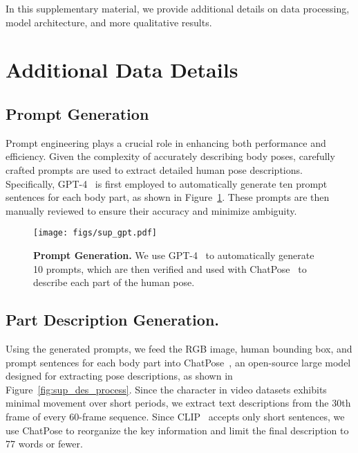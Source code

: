 \clearpage


In this supplementary material, we provide additional details on data processing, model architecture, and more qualitative results.

\section{Additional Data Details}

\subsection{Prompt Generation} Prompt engineering plays a crucial role in enhancing both performance and efficiency. Given the complexity of accurately describing body poses, carefully crafted prompts are used to extract detailed human pose descriptions. Specifically, GPT-4~\cite{GPT4} is first employed to automatically generate ten prompt sentences for each body part, as shown in Figure~\ref{fig:sup_gpt}. These prompts are then manually reviewed to ensure their accuracy and minimize ambiguity.

\begin{figure}[h]
    \centering
    \texttt{[image: figs/sup\_gpt.pdf]}
    \caption{\textbf{Prompt Generation.} We use GPT-4~\cite{GPT4} to automatically generate 10 prompts, which are then verified and used with ChatPose~\cite{ChatPose} to describe each part of the human pose.}
    \label{fig:sup_gpt}
\end{figure}

\vspace{-4mm}

\subsection{Part Description Generation.} 
Using the generated prompts, we feed the RGB image, human bounding box, and prompt sentences for each body part into ChatPose~\cite{ChatPose}, an open-source large model designed for extracting pose descriptions, as shown in Figure~\ref{fig:sup_des_process}. Since the character in video datasets exhibits minimal movement over short periods, we extract text descriptions from the 30th frame of every 60-frame sequence. Since CLIP~\cite{CLIP} accepts only short sentences, we use ChatPose to reorganize the key information and limit the final description to 77 words or fewer.

